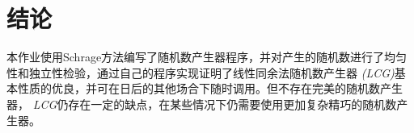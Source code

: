 \documentclass[12pt,a4paper,utf8]{ctexart}
\begin{document}
\section{结论}
本作业使用Schrage方法编写了随机数产生器程序，并对产生的随机数进行了均匀性和独立性检验，通过自己的程序实现证明了线性同余法随机数产生器
\textsl{(LCG)}基本性质的优良，并可在日后的其他场合下随时调用。但不存在完美的随机数产生器，
\textsl{LCG}仍存在一定的缺点，在某些情况下仍需要使用更加复杂精巧的随机数产生器。
\end{document}
